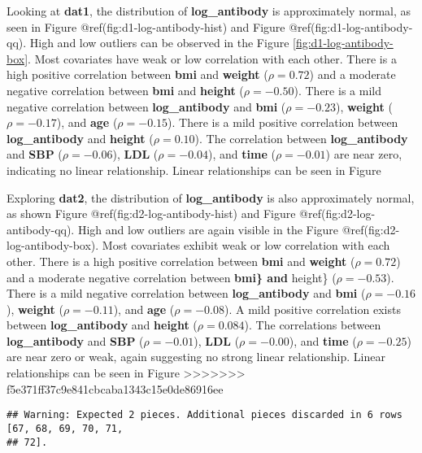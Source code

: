 \documentclass[
]{article}
\begin{document}
Looking at \textbf{dat1}, the distribution of \textbf{log\_antibody} is
approximately normal, as seen in Figure @ref(fig:d1-log-antibody-hist)
and Figure @ref(fig:d1-log-antibody-qq). High and low outliers can be
observed in the Figure \ref{fig:d1-log-antibody-box}. Most covariates
have weak or low correlation with each other. There is a high positive
correlation between \textbf{bmi} and \textbf{weight} (\(\rho = 0.72\))
and a moderate negative correlation between \textbf{bmi} and
\textbf{height} (\(\rho = -0.50\)). There is a mild negative correlation
between \textbf{log\_antibody} and \textbf{bmi} (\(\rho = -0.23\)),
\textbf{weight} (\(\rho = -0.17\)), and \textbf{age} (\(\rho = -0.15\)).
There is a mild positive correlation between \textbf{log\_antibody} and
\textbf{height} (\(\rho = 0.10\)). The correlation between
\textbf{log\_antibody} and \textbf{SBP} (\(\rho = -0.06\)), \textbf{LDL}
(\(\rho = -0.04\)), and \textbf{time} (\(\rho = -0.01\)) are near zero,
indicating no linear relationship. Linear relationships can be seen in
Figure

Exploring \textbf{dat2}, the distribution of \textbf{log\_antibody} is
also approximately normal, as shown Figure
@ref(fig:d2-log-antibody-hist) and Figure @ref(fig:d2-log-antibody-qq).
High and low outliers are again visible in the Figure
@ref(fig:d2-log-antibody-box). Most covariates exhibit weak or low
correlation with each other. There is a high positive correlation
between \textbf{bmi} and \textbf{weight} (\(\rho = 0.72\)) and a
moderate negative correlation between \textbf{bmi\} and }height\}
(\(\rho = -0.53\)). There is a mild negative correlation between
\textbf{log\_antibody} and \textbf{bmi} (\(\rho = -0.16\)),
\textbf{weight} (\(\rho = -0.11\)), and \textbf{age} (\(\rho = -0.08\)).
A mild positive correlation exists between \textbf{log\_antibody} and
\textbf{height} (\(\rho = 0.084\)). The correlations between
\textbf{log\_antibody} and \textbf{SBP} (\(\rho = -0.01\)), \textbf{LDL}
(\(\rho = -0.00\)), and \textbf{time} (\(\rho = -0.25\)) are near zero
or weak, again suggesting no strong linear relationship. Linear
relationships can be seen in Figure
\textgreater\textgreater\textgreater\textgreater\textgreater\textgreater\textgreater{}
f5e371ff37c9e841cbcaba1343c15e0de86916ee

\begin{verbatim}
## Warning: Expected 2 pieces. Additional pieces discarded in 6 rows [67, 68, 69, 70, 71,
## 72].
\end{verbatim}
\end{document}
